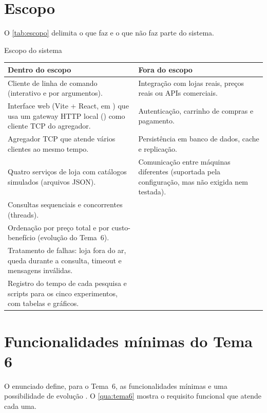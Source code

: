 \section{Escopo}

O \autoref{tab:escopo} delimita o que faz e o que não faz parte do sistema.

\begin{quadro}[!htbp]
  \centering\small
  \caption{Escopo do sistema}\label{tab:escopo}
  \begin{tabularx}{\textwidth}{|Y|Y|}
    \hline
    \textbf{Dentro do escopo} & \textbf{Fora do escopo} \\ \hline
    Cliente de linha de comando (interativo e por argumentos). & Integração com lojas reais, preços reais ou APIs comerciais. \\ \hline
    Interface web (Vite + React, em ) que usa um gateway HTTP local () como cliente TCP do agregador. & Autenticação, carrinho de compras e pagamento. \\ \hline
    Agregador TCP que atende vários clientes ao mesmo tempo. & Persistência em banco de dados, cache e replicação. \\ \hline
    Quatro serviços de loja com catálogos simulados (arquivos JSON). & Comunicação entre máquinas diferentes (suportada pela configuração, mas não exigida nem testada). \\ \hline
    Consultas sequenciais e concorrentes (threads). & \\ \hline
    Ordenação por preço total e por custo-benefício (evolução do Tema~6). & \\ \hline
    Tratamento de falhas: loja fora do ar, queda durante a consulta, timeout e mensagens inválidas. & \\ \hline
    Registro do tempo de cada pesquisa e scripts para os cinco experimentos, com tabelas e gráficos. & \\ \hline  \end{tabularx}
  \fonteautores
\end{quadro}

\section{Funcionalidades mínimas do Tema 6}

O enunciado define, para o Tema~6, as funcionalidades mínimas e uma possibilidade de evolução \cite{enunciado2026}. O \autoref{qua:tema6} mostra o requisito funcional que atende cada uma.

